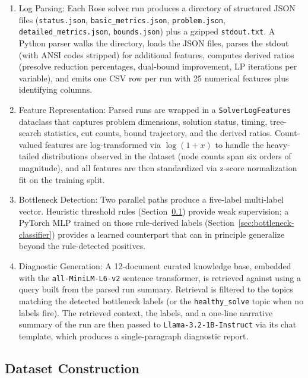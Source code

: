\documentclass[11pt]{article}
\begin{document}
\begin{enumerate}
    \item Log Parsing: Each Rose solver run produces a directory of structured JSON files (\texttt{status.json}, \texttt{basic\_metrics.json}, \texttt{problem.json}, \texttt{detailed\_metrics.json}, \texttt{bounds.json}) plus a gzipped \texttt{stdout.txt}. A Python parser walks the directory, loads the JSON files, parses the stdout (with ANSI codes stripped) for additional features, computes derived ratios (presolve reduction percentages, dual-bound improvement, LP iterations per variable), and emits one CSV row per run with 25 numerical features plus identifying columns.
    \item Feature Representation: Parsed runs are wrapped in a \texttt{SolverLogFeatures} dataclass that captures problem dimensions, solution status, timing, tree-search statistics, cut counts, bound trajectory, and the derived ratios. Count-valued features are log-transformed via $\log(1+x)$ to handle the heavy-tailed distributions observed in the dataset (node counts span six orders of magnitude), and all features are then standardized via z-score normalization fit on the training split.
    \item Bottleneck Detection: Two parallel paths produce a five-label multi-label vector. Heuristic threshold rules (Section~\ref{sec:dataset}) provide weak supervision; a PyTorch MLP trained on those rule-derived labels (Section~\ref{sec:bottleneck-classifier}) provides a learned counterpart that can in principle generalize beyond the rule-detected positives.
    \item Diagnostic Generation: A 12-document curated knowledge base, embedded with the \texttt{all-MiniLM-L6-v2} sentence transformer, is retrieved against using a query built from the parsed run summary. Retrieval is filtered to the topics matching the detected bottleneck labels (or the \texttt{healthy\_solve} topic when no labels fire). The retrieved context, the labels, and a one-line narrative summary of the run are then passed to \texttt{Llama-3.2-1B-Instruct} via its chat template, which produces a single-paragraph diagnostic report.
\end{enumerate}

\subsection{Dataset Construction}
\label{sec:dataset}
\end{document}
